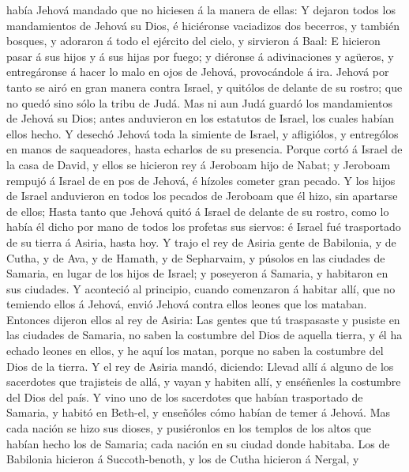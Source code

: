 había Jehová mandado que no hiciesen á la manera de ellas:
 Y dejaron todos los mandamientos de Jehová su Dios, é
hiciéronse vaciadizos dos becerros, y también bosques, y adoraron á todo
el ejército del cielo, y sirvieron á Baal:  E hicieron
pasar á sus hijos y á sus hijas por fuego; y diéronse á adivinaciones y
agüeros, y entregáronse á hacer lo malo en ojos de Jehová, provocándole
á ira.  Jehová por tanto se airó en gran manera contra
Israel, y quitólos de delante de su rostro; que no quedó sino sólo la
tribu de Judá.  Mas ni aun Judá guardó los mandamientos
de Jehová su Dios; antes anduvieron en los estatutos de Israel, los
cuales habían ellos hecho.  Y desechó Jehová toda la
simiente de Israel, y afligiólos, y entrególos en manos de saqueadores,
hasta echarlos de su presencia.  Porque cortó á Israel de
la casa de David, y ellos se hicieron rey á Jeroboam hijo de Nabat; y
Jeroboam rempujó á Israel de en pos de Jehová, é hízoles cometer gran
pecado.  Y los hijos de Israel anduvieron en todos los
pecados de Jeroboam que él hizo, sin apartarse de ellos; 
Hasta tanto que Jehová quitó á Israel de delante de su rostro, como lo
había él dicho por mano de todos los profetas sus siervos: é Israel fué
trasportado de su tierra á Asiria, hasta hoy.  Y trajo el
rey de Asiria gente de Babilonia, y de Cutha, y de Ava, y de Hamath, y
de Sepharvaim, y púsolos en las ciudades de Samaria, en lugar de los
hijos de Israel; y poseyeron á Samaria, y habitaron en sus ciudades.
 Y aconteció al principio, cuando comenzaron á habitar
allí, que no temiendo ellos á Jehová, envió Jehová contra ellos leones
que los mataban.  Entonces dijeron ellos al rey de
Asiria: Las gentes que tú traspasaste y pusiste en las ciudades de
Samaria, no saben la costumbre del Dios de aquella tierra, y él ha
echado leones en ellos, y he aquí los matan, porque no saben la
costumbre del Dios de la tierra.  Y el rey de Asiria
mandó, diciendo: Llevad allí á alguno de los sacerdotes que trajisteis
de allá, y vayan y habiten allí, y enséñenles la costumbre del Dios del
país.  Y vino uno de los sacerdotes que habían
trasportado de Samaria, y habitó en Beth-el, y enseñóles cómo habían de
temer á Jehová.  Mas cada nación se hizo sus dioses, y
pusiéronlos en los templos de los altos que habían hecho los de Samaria;
cada nación en su ciudad donde habitaba.  Los de
Babilonia hicieron á Succoth-benoth, y los de Cutha hicieron á Nergal, y

